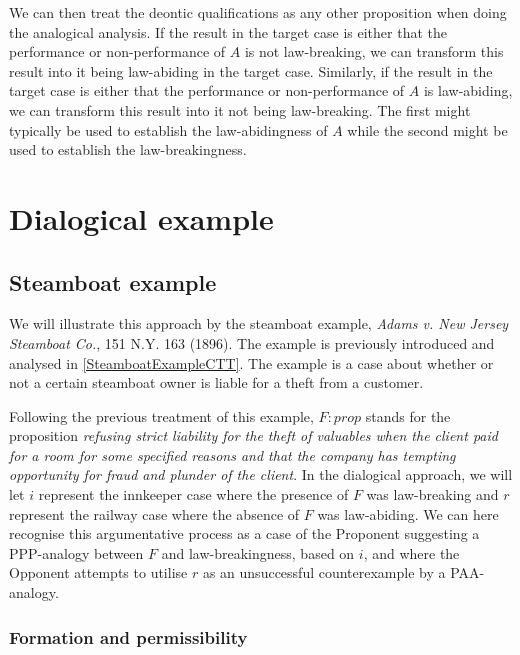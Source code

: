 		We can then treat the deontic qualifications as any other proposition when doing the analogical analysis. If the result in the target case is either that the performance or non-performance of $A$ is not law-breaking, we can transform this result into it being law-abiding in the target case. Similarly, if the result in the target case is either that the performance or non-performance of $A$ is law-abiding, we can transform this result into it not being law-breaking. The first might typically be used to establish the law-abidingness of $A$ while the second might be used to establish the law-breakingness.
		
	\section{Dialogical example}\label{SteamboatExampleDialogical}
			
		\subsection{Steamboat example}
		
			We will illustrate this approach by the steamboat example, \textsf{\textit{Adams v. New Jersey Steamboat Co.}, 151 N.Y. 163 (1896)}. The example is previously introduced and analysed in \autoref{SteamboatExampleCTT}. The example is a case about whether or not a certain steamboat owner is liable for a theft from a customer. 
			
			Following the previous treatment of this example, $F : prop$ stands for the proposition \textit{refusing strict liability for the theft of valuables when the client paid for a room for some specified reasons and that the company has tempting opportunity for fraud and plunder of the client}. In the dialogical approach, we will let $i$ represent the innkeeper case where the presence of $F$ was law-breaking and $r$ represent the railway case where the absence of $F$ was law-abiding. We can here recognise this argumentative process as a case of the Proponent suggesting a PPP-analogy between $F$ and law-breakingness, based on $i$, and where the Opponent attempts to utilise $r$ as an unsuccessful counterexample by a PAA-analogy.
		
			\subsubsection{Formation and permissibility}
		
